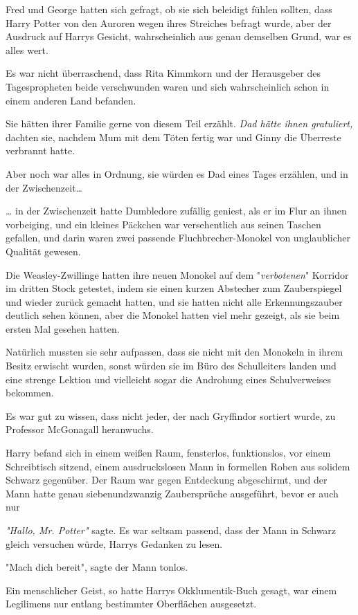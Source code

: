 {Fred und George hatten sich gefragt, ob sie sich beleidigt fühlen sollten, dass Harry Potter von den Auroren wegen ihres Streiches befragt wurde, aber der Ausdruck auf Harrys Gesicht, wahrscheinlich aus genau demselben Grund, war es alles wert.

Es war nicht überraschend, dass Rita Kimmkorn und der Herausgeber des Tagespropheten beide verschwunden waren und sich wahrscheinlich schon in einem anderen Land befanden.

Sie hätten ihrer Familie gerne von diesem Teil erzählt. \emph{Dad hätte ihnen gratuliert,} dachten sie, nachdem Mum mit dem Töten fertig war und Ginny die Überreste verbrannt hatte.

Aber noch war alles in Ordnung, sie würden es Dad eines Tages erzählen, und in der Zwischenzeit…

… in der Zwischenzeit hatte Dumbledore zufällig geniest, als er im Flur an ihnen vorbeiging, und ein kleines Päckchen war versehentlich aus seinen Taschen gefallen, und darin waren zwei passende Fluchbrecher-Monokel von unglaublicher Qualität gewesen.

Die Weasley-Zwillinge hatten ihre neuen Monokel auf dem "\emph{verbotenen}" Korridor im dritten Stock getestet, indem sie einen kurzen Abstecher zum Zauberspiegel und wieder zurück gemacht hatten, und sie hatten nicht alle Erkennungszauber deutlich sehen können, aber die Monokel hatten viel mehr gezeigt, als sie beim ersten Mal gesehen hatten.

Natürlich mussten sie sehr aufpassen, dass sie nicht mit den Monokeln in ihrem Besitz erwischt wurden, sonst würden sie im Büro des Schulleiters landen und eine strenge Lektion und vielleicht sogar die Androhung eines Schulverweises bekommen.

Es war gut zu wissen, dass nicht jeder, der nach Gryffindor sortiert wurde, zu Professor McGonagall heranwuchs.

Harry befand sich in einem weißen Raum, fensterlos, funktionslos, vor einem Schreibtisch sitzend, einem ausdruckslosen Mann in formellen Roben aus solidem Schwarz gegenüber. Der Raum war gegen Entdeckung abgeschirmt, und der Mann hatte genau siebenundzwanzig Zaubersprüche ausgeführt, bevor er auch nur

\emph{"Hallo, Mr. Potter"} sagte. Es war seltsam passend, dass der Mann in Schwarz gleich versuchen würde, Harrys Gedanken zu lesen.

"Mach dich bereit", sagte der Mann tonlos.

Ein menschlicher Geist, so hatte Harrys Okklumentik-Buch gesagt, war einem Legilimens nur entlang bestimmter Oberflächen ausgesetzt.

}
